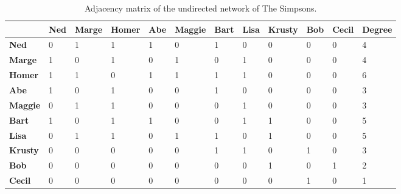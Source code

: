 \documentclass[
  notitlepage,
  onecolumn,
  openany]{book}
\begin{document}
\begin{table}[h]
\centering
\begin{tabular}{@{}llllllllllll@{}}
\toprule
\textbf{}       & \textbf{Ned} & \textbf{Marge} & \textbf{Homer} & \textbf{Abe} & \textbf{Maggie} & \textbf{Bart} & \textbf{Lisa} & \textbf{Krusty} & \textbf{Bob} & \textbf{Cecil} & \textbf{Degree} \\ \midrule
\textbf{Ned}    & 0            & 1              & 1              & 1            & 0               & 1             & 0             & 0               & 0            & 0              & 4               \\
\textbf{Marge}  & 1            & 0              & 1              & 0            & 1               & 0             & 1             & 0               & 0            & 0              & 4               \\
\textbf{Homer}  & 1            & 1              & 0              & 1            & 1               & 1             & 1             & 0               & 0            & 0              & 6               \\
\textbf{Abe}    & 1            & 0              & 1              & 0            & 0               & 1             & 0             & 0               & 0            & 0              & 3               \\
\textbf{Maggie} & 0            & 1              & 1              & 0            & 0               & 0             & 1             & 0               & 0            & 0              & 3               \\
\textbf{Bart}   & 1            & 0              & 1              & 1            & 0               & 0             & 1             & 1               & 0            & 0              & 5               \\
\textbf{Lisa}   & 0            & 1              & 1              & 0            & 1               & 1             & 0             & 1               & 0            & 0              & 5               \\
\textbf{Krusty} & 0            & 0              & 0              & 0            & 0               & 1             & 1             & 0               & 1            & 0              & 3               \\
\textbf{Bob}    & 0            & 0              & 0              & 0            & 0               & 0             & 0             & 1               & 0            & 1              & 2               \\
\textbf{Cecil}  & 0            & 0              & 0              & 0            & 0               & 0             & 0             & 0               & 1            & 0              & 1               \\ \bottomrule
\end{tabular}
\caption{Adjacency matrix of the undirected network of The Simpsons.}
\label{tab:undirected_network}
\end{table}
\end{document}
